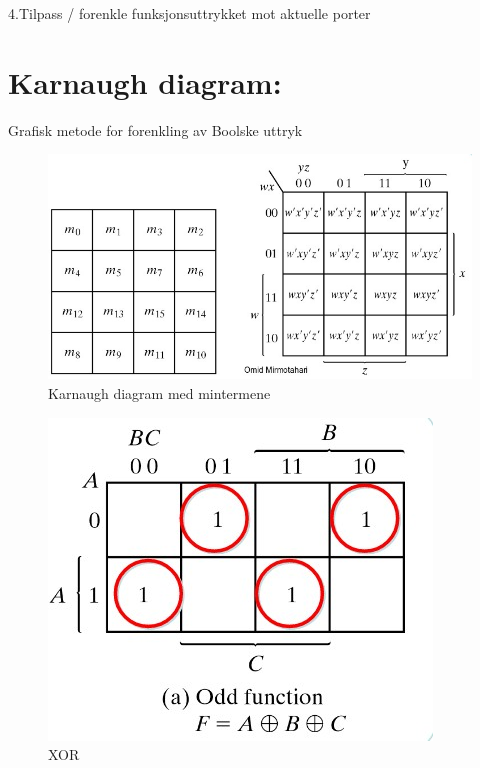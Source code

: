 \documentclass{article}
\begin{document}
	4.Tilpass / forenkle funksjonsuttrykket mot 
	aktuelle porter 
	
	\section{Karnaugh diagram:}
	Grafisk metode for forenkling av Boolske uttryk
	\begin{figure}[H]
		\includegraphics[scale = 0.6]{KarnaD.jpg}
		\caption{Karnaugh diagram med mintermene}
	\end{figure}
	
	\begin{figure}[H]
		\includegraphics[scale = 0.6]{XOR.jpg}
		\caption{XOR}
	\end{figure}
	
\end{document}
